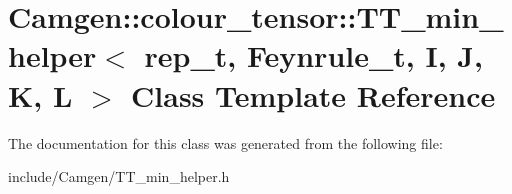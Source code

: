 \hypertarget{a00538}{\section{Camgen\-:\-:colour\-\_\-tensor\-:\-:T\-T\-\_\-min\-\_\-helper$<$ rep\-\_\-t, Feynrule\-\_\-t, I, J, K, L $>$ Class Template Reference}
\label{a00538}
}


The documentation for this class was generated from the following file\-:\begin{DoxyCompactItemize}
\item 
include/\-Camgen/T\-T\-\_\-min\-\_\-helper.\-h\end{DoxyCompactItemize}
